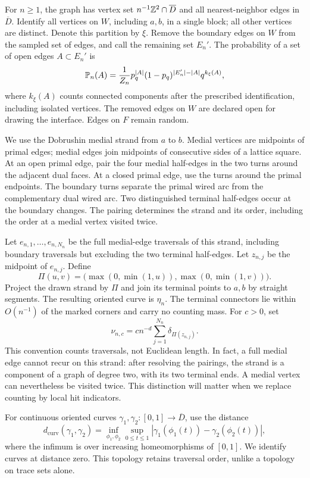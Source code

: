 For $n\ge1$, the graph has vertex set
$n^{-1}\mathbb Z^2\cap\overline D$ and all nearest-neighbor edges in
$\overline D$. Identify all vertices on $W$, including $a,b$, in a
single block; all other vertices are distinct. Denote this partition by
$\xi$. Remove the boundary edges on $W$ from the sampled set of edges,
and call the remaining set $E_n'$. The probability of a set of open
edges $A\subset E_n'$ is
\[
 \mathbb P_n(A)=\frac{1}{Z_n}
 p_q^{|A|}(1-p_q)^{|E_n'|-|A|}q^{k_\xi(A)},
\]
where $k_\xi(A)$ counts connected components after the prescribed
identification, including isolated vertices. The removed edges on $W$
are declared open for drawing the interface. Edges on $F$ remain random.

We use the Dobrushin medial strand from $a$ to $b$. Medial vertices are
midpoints of primal edges; medial edges join midpoints of consecutive
sides of a lattice square. At an open primal edge, pair the four medial
half-edges in the two turns around the adjacent dual faces. At a closed
primal edge, use the turns around the primal endpoints. The boundary
turns separate the primal wired arc from the complementary dual wired
arc. Two distinguished terminal half-edges occur at the boundary changes.
The pairing determines the strand and its order, including the order at
a medial vertex visited twice.

Let $e_{n,1},\ldots,e_{n,N_n}$ be the full medial-edge traversals of
this strand, including boundary traversals but excluding the two
terminal half-edges. Let $z_{n,j}$ be the midpoint of $e_{n,j}$.
Define
\[
 \Pi(u,v)=\bigl(\max(0,\min(1,u)),\max(0,\min(1,v))\bigr).
\]
Project the drawn strand by $\Pi$ and join its terminal points to $a,b$
by straight segments. The resulting oriented curve is $\eta_n$.
The terminal connectors lie within $O(n^{-1})$ of the marked corners
and carry no counting mass. For $c>0$, set
\begin{equation}\label{eq:counting-measure}
 \nu_{n,c}=c n^{-d}\sum_{j=1}^{N_n}\delta_{\Pi(z_{n,j})}.
\end{equation}
This convention counts traversals, not Euclidean length. In fact, a full
medial edge cannot recur on this strand: after resolving the pairings,
the strand is a component of a graph of degree two, with its two terminal
ends. A medial vertex can nevertheless be visited twice. This distinction
will matter when we replace counting by local hit indicators.

For continuous oriented curves $\gamma_1,\gamma_2:[0,1]\to\overline D$,
use the distance
\begin{equation}\label{eq:curve-metric}
 d_{\mathrm{curv}}(\gamma_1,\gamma_2)
 =\inf_{\phi_1,\phi_2}\sup_{0\le t\le1}
 |\gamma_1(\phi_1(t))-\gamma_2(\phi_2(t))|,
\end{equation}
where the infimum is over increasing homeomorphisms of $[0,1]$.
We identify curves at distance zero. This topology retains traversal
order, unlike a topology on trace sets alone.

